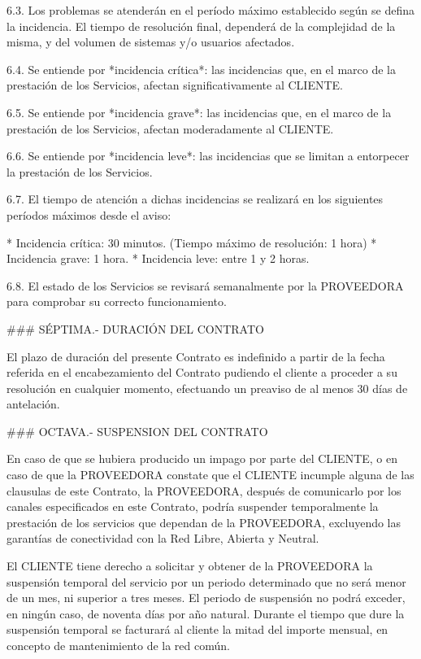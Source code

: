 6.3.
	Los problemas se atenderán en el período máximo establecido según se defina la incidencia.
	El tiempo de resolución final, dependerá de la complejidad de la misma, y del volumen de sistemas y/o usuarios afectados.

6.4.
	Se entiende por *incidencia crítica*:
	las incidencias que, en el marco de la prestación de los Servicios, afectan significativamente al CLIENTE.

6.5.
	Se entiende por *incidencia grave*:
	las incidencias que, en el marco de la prestación de los Servicios, afectan moderadamente al CLIENTE.

6.6.
	Se entiende por *incidencia leve*:
	las incidencias que se limitan a entorpecer la prestación de los Servicios.

6.7.
	El tiempo de atención a dichas incidencias se realizará en los siguientes períodos máximos desde el aviso:

* Incidencia crítica: 30 minutos. (Tiempo máximo de resolución: 1 hora)
* Incidencia grave:   1 hora.
* Incidencia leve:    entre 1 y 2 horas.

6.8.
	El estado de los Servicios se revisará semanalmente por la PROVEEDORA para comprobar su correcto funcionamiento.


### SÉPTIMA.- DURACIÓN DEL CONTRATO

El plazo de duración del presente Contrato es indefinido 
a partir de la fecha referida en el encabezamiento del Contrato
pudiendo el cliente a proceder a su resolución en cualquier momento,
efectuando un preaviso de al menos 30 días de antelación.


### OCTAVA.- SUSPENSION DEL CONTRATO

En caso de que se hubiera producido un impago por parte del CLIENTE,
o en caso de que la PROVEEDORA constate que el CLIENTE incumple alguna de las clausulas de este Contrato,
la PROVEEDORA, después de comunicarlo por los canales especificados en este Contrato,
podría suspender temporalmente la prestación de los servicios que dependan de la PROVEEDORA,
excluyendo las garantías de conectividad con la Red Libre, Abierta y Neutral.

El CLIENTE tiene derecho a solicitar y obtener de la PROVEEDORA la suspensión temporal del servicio
por un periodo determinado que no será menor de un mes, ni superior a tres meses.
El periodo de suspensión no podrá exceder, en ningún caso, de noventa días por año natural.
Durante el tiempo que dure la suspensión temporal se facturará al cliente la mitad del importe mensual,
en concepto de mantenimiento de la red común.

